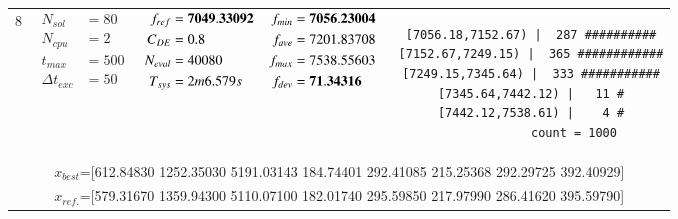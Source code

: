 \begin{table*} [!t]
\begin{tabular}[c]{ccccc}
8
&
{$\!\begin{aligned}
    N_{sol}        &= 80 \\
	N_{cpu}        &= 2 \\
	t_{max}        &= 500 \\
	\Delta t_{exc} &= 50
\end{aligned}$}
&
{$\!\begin{aligned}
	f_{ref} &= {\bf 7049.33092} \\
	C_{DE}   &= 0.8 \\
	N_{eval} &= 40080 \\
	T_{sys}  &= 2m6.579s
\end{aligned}$}
&
{$\!\begin{aligned}
    f_{min} &= {\bf 7056.23004} \\
    f_{ave} &= 7201.83708 \\
    f_{max} &= 7538.55603 \\
    f_{dev} &= {\bf 71.34316}
\end{aligned}$}
&
\begin{minipage}{4.1cm} \fontsize{5pt}{6pt}
\begin{verbatim}
 [7056.18,7152.67) |  287 ##########
 [7152.67,7249.15) |  365 ############
 [7249.15,7345.64) |  333 ###########
 [7345.64,7442.12) |   11 #
 [7442.12,7538.61) |    4 #
             count = 1000
 \end{verbatim}
\end{minipage} \\
\multicolumn{5}{c}{{\scriptsize $x_{best}$=[612.84830 1252.35030 5191.03143 184.74401 292.41085 215.25368 292.29725 392.40929]}} \\
\multicolumn{5}{c}{{\scriptsize $x_{ref.}$=[579.31670 1359.94300 5110.07100 182.01740 295.59850 217.97990 286.41620 395.59790]}} \\

\hline




\end{tabular}
\end{table*}
